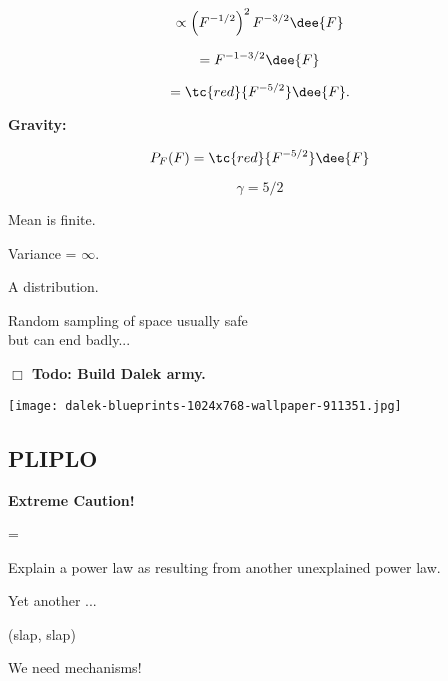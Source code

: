       $$ \propto \left(F^{-1/2}\right)^{2}  F^{-3/2} \dee{F} $$
     
      $$ = F^{-1 -3/2} \dee{F} $$
     
      $$ = \tc{red}{F^{-5/2}} \dee{F}. $$
    
  


  \textbf{Gravity:}

  \textbf{$$ P_F(F) = \tc{red}{F^{-5/2}} \dee{F} $$}
  
     
    $$ \gamma = 5/2 $$
   
    Mean is finite.
   
    Variance = $\infty$.
   
    A  distribution.
   
     Random sampling of space usually safe\\
    but can end badly...
  
  



\textbf{$\Box$ Todo: Build Dalek army.}
  
\texttt{[image: dalek-blueprints-1024x768-wallpaper-911351.jpg]}



\subsection{PLIPLO}

  \textbf{Extreme Caution!}

  
    
     
       = 
     
      Explain a power law as resulting 
      from another unexplained power law.
    
      Yet another ...
    
        (slap, slap)
    
      We need mechanisms!
    
  
  


